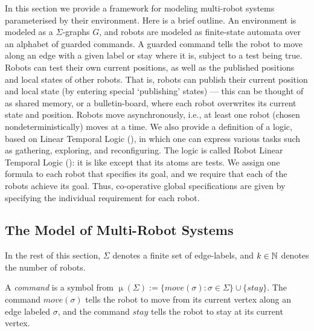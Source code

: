 In this section we provide a framework for modeling multi-robot systems parameterised by their environment. Here is a brief outline.
An environment is modeled as a $\Sigma$-graphs $G$, and robots are modeled as finite-state automata over an alphabet of guarded commands.
A guarded command tells the robot to move along an edge with a given label or stay where it is, subject to a test being true.
Robots can test their own current positions, as well as the published positions and local states of other robots. That is, robots can publish their current
position and local state (by entering special `publishing' states) --- this can be thought of as shared memory, or a bulletin-board, where each robot overwrites
its current state and position. Robots move asynchronously, i.e., at least one robot (chosen nondeterministically) moves at a time.
We also provide a definition of a logic, based on Linear Temporal Logic (\LTL), in which one can express various tasks such as gathering, exploring, and reconfiguring.  The logic is called Robot Linear Temporal Logic (\RLTL): it is like \LTL except that its atoms are tests. We assign one \RLTL formula to each robot that specifies its goal, and we require that each of the robots achieve its goal. Thus, co-operative global specifications are given by specifying the individual requirement for each robot.

\subsection{The Model of Multi-Robot Systems}

In the rest of this section, $\Sigma$ denotes a finite set of edge-labels, and $k \in \mathbb{N}$ denotes the number of robots.

%
A {\em command} is a symbol from $\upmu(\Sigma) := \{move(\sigma) : \sigma \in \Sigma\} \cup
\{stay\}$.  The command $move(\sigma)$ tells the robot to move
from its current vertex along an edge labeled $\sigma$, and the command
$stay$ tells the robot to stay at its current vertex.

